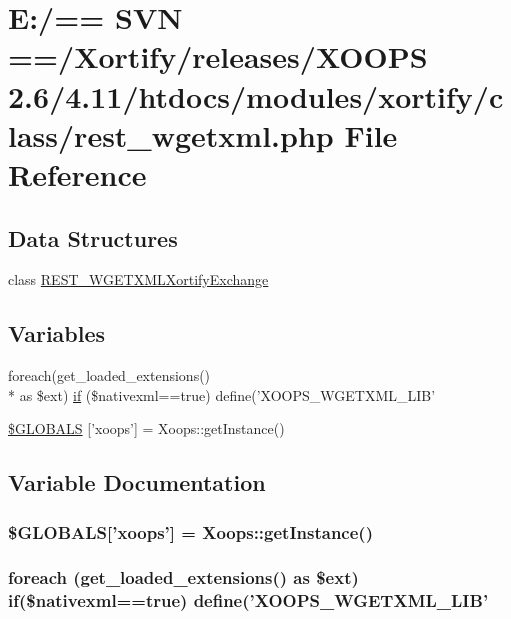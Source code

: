 \hypertarget{rest__wgetxml_8php}{\section{E\-:/== S\-V\-N ==/\-Xortify/releases/\-X\-O\-O\-P\-S 2.6/4.11/htdocs/modules/xortify/class/rest\-\_\-wgetxml.php File Reference}
\label{rest__wgetxml_8php}
}
\subsection*{Data Structures}
\begin{DoxyCompactItemize}
\item 
class \hyperlink{class_r_e_s_t___w_g_e_t_x_m_l_xortify_exchange}{R\-E\-S\-T\-\_\-\-W\-G\-E\-T\-X\-M\-L\-Xortify\-Exchange}
\end{DoxyCompactItemize}
\subsection*{Variables}
\begin{DoxyCompactItemize}
\item 
foreach(get\-\_\-loaded\-\_\-extensions() \\*
as \$ext) \hyperlink{rest__wgetxml_8php_a121ad903444481b9834116cef5ea2f4d}{if} (\$nativexml==true) define('X\-O\-O\-P\-S\-\_\-\-W\-G\-E\-T\-X\-M\-L\-\_\-\-L\-I\-B'
\item 
\hyperlink{rest__wgetxml_8php_ad10934112c0d18cf6b358d47afa6fcf1}{\$\-G\-L\-O\-B\-A\-L\-S} \mbox{[}'xoops'\mbox{]} = Xoops\-::get\-Instance()
\end{DoxyCompactItemize}


\subsection{Variable Documentation}
\hypertarget{rest__wgetxml_8php_ad10934112c0d18cf6b358d47afa6fcf1}{
\subsubsection[{\$\-G\-L\-O\-B\-A\-L\-S}]{\setlength{\rightskip}{0pt plus 5cm}\$G\-L\-O\-B\-A\-L\-S\mbox{[}'xoops'\mbox{]} = Xoops\-::get\-Instance()}}\label{rest__wgetxml_8php_ad10934112c0d18cf6b358d47afa6fcf1}
\hypertarget{rest__wgetxml_8php_a121ad903444481b9834116cef5ea2f4d}{
\subsubsection[{if}]{\setlength{\rightskip}{0pt plus 5cm}foreach (get\-\_\-loaded\-\_\-extensions() as \$ext) if(\$nativexml==true) define('X\-O\-O\-P\-S\-\_\-\-W\-G\-E\-T\-X\-M\-L\-\_\-\-L\-I\-B'}}\label{rest__wgetxml_8php_a121ad903444481b9834116cef5ea2f4d}
